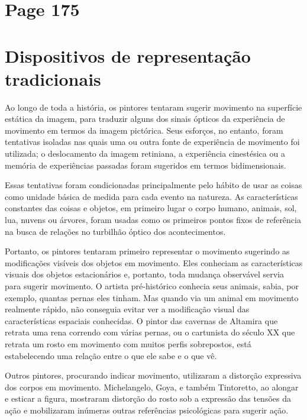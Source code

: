 \documentclass[a4paper]{article}
\begin{document}
\vspace*{\fill}

\newpage
\section*{Page 175}

\section*{Dispositivos de representação tradicionais}

Ao longo de toda a história, os pintores tentaram sugerir movimento na superfície estática da imagem, para traduzir alguns dos sinais ópticos da experiência de movimento em termos da imagem pictórica. Seus esforços, no entanto, foram tentativas isoladas nas quais uma ou outra fonte de experiência de movimento foi utilizada; o deslocamento da imagem retiniana, a experiência cinestésica ou a memória de experiências passadas foram sugeridos em termos bidimensionais.

Essas tentativas foram condicionadas principalmente pelo hábito de usar as coisas como unidade básica de medida para cada evento na natureza. As características constantes das coisas e objetos, em primeiro lugar o corpo humano, animais, sol, lua, nuvens ou árvores, foram usadas como os primeiros pontos fixos de referência na busca de relações no turbilhão óptico dos acontecimentos.

Portanto, os pintores tentaram primeiro representar o movimento sugerindo as modificações visíveis dos objetos em movimento. Eles conheciam as características visuais dos objetos estacionários e, portanto, toda mudança observável servia para sugerir movimento. O artista pré-histórico conhecia seus animais, sabia, por exemplo, quantas pernas eles tinham. Mas quando via um animal em movimento realmente rápido, não conseguia evitar ver a modificação visual das características espaciais conhecidas. O pintor das cavernas de Altamira que retrata uma rena correndo com várias pernas, ou o cartunista do século XX que retrata um rosto em movimento com muitos perfis sobrepostos, está estabelecendo uma relação entre o que ele sabe e o que vê.

Outros pintores, procurando indicar movimento, utilizaram a distorção expressiva dos corpos em movimento. Michelangelo, Goya, e também Tintoretto, ao alongar e esticar a figura, mostraram distorção do rosto sob a expressão das tensões da ação e mobilizaram inúmeras outras referências psicológicas para sugerir ação.
\end{document}
